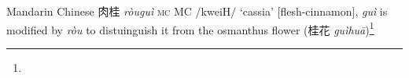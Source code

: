\begin{etymology}\label{ety:rougui}
Mandarin Chinese {肉桂} \textit{ròuguì} \textsc{mc} MC /kweiH/ `cassia' [flesh-cinnamon], \textit{guì} is modified by \textit{ròu} to distuinguish it from the osmanthus flower (桂花 \textit{guìhuā})\footnote{}
\end{etymology}